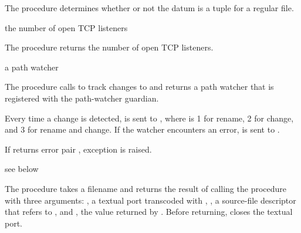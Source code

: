 The  procedure determines whether or not the
datum  is a  tuple for a regular file.

\begin{procedure}
\end{procedure}
\returns{} the number of open TCP listeners

The  procedure returns the number of open TCP
listeners.

\begin{procedure}
\end{procedure}
\returns{} a path watcher

The  procedure calls  to track
changes to  and returns a path watcher that is registered
with the path-watcher guardian.

Every time a change is detected,  is sent to , where
 is 1 for rename, 2 for change, and 3 for rename and
change. If the watcher encounters an error,
 is sent to
.

If  returns error pair , exception  is raised.

\begin{procedure}
\end{procedure}
\returns{} see below

The  procedure takes a filename
 and returns the result of calling the procedure
 with three arguments: , a textual port
transcoded with , , a
source-file descriptor that refers to , and
, the value returned by .
Before returning,  closes the textual
port.


